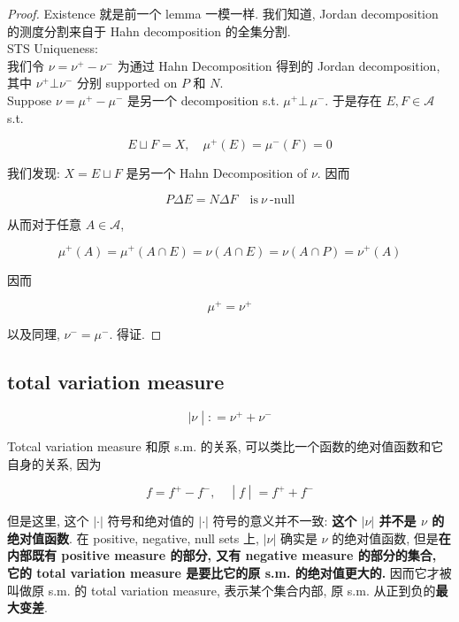 \begin{proof}

Existence 就是前一个 lemma 一模一样. 我们知道, Jordan decomposition 的测度分割来自于 Hahn decomposition 的全集分割.\\
STS Uniqueness:\\
我们令 \(\nu = \nu^{+} - \nu^{-}\) 为通过 Hahn Decomposition 得到的 Jordan decomposition, 其中 \(\nu^{+}\bot\nu^{-}\) 分别 supported on \(P\) 和 \(N\).\\
Suppose \(\nu = \mu^{+} - \mu^{-}\) 是另一个 decomposition s.t. \(\mu^{+}\bot\,\mu^{-}\). 于是存在 \(E,F \in \mathcal{A}\) s.t.

\[E \sqcup F = X,\quad\mu^{+}(E) = \mu^{-}(F) = 0\]

我们发现: \(X = E \sqcup F\) 是另一个 Hahn Decomposition of \(\nu\). 因而

\[P\Delta E = N\Delta F\quad\text{is}\ \nu\ \text{-null}\]

从而对于任意 \(A \in \mathcal{A}\),

\[\mu^{+}(A) = \mu^{+}(A \cap E) = \nu(A \cap E) = \nu(A \cap P) = \nu^{+}(A)\]

因而

\[\mu^{+} = \nu^{+}\]

以及同理, \(\nu^{-} = \mu^{-}\). 得证.

\end{proof}

\subsection{total variation measure}\label{total-variation-measure}

\begin{definition}{}

\[\left. |\nu \middle| : = \nu^{+} + \nu^{-} \right.\]

\end{definition}

Totcal variation measure 和原 s.m. 的关系, 可以类比一个函数的绝对值函数和它自身的关系, 因为

\[\left. f = f^{+} - f^{-},\quad \middle| f \middle| = f^{+} + f^{-} \right.\]

但是这里, 这个 \(| \cdot |\) 符号和绝对值的 \(| \cdot |\) 符号的意义并不一致: \textbf{这个 \(|\nu|\) 并不是 \(\nu\) 的绝对值函数}. 在 positive, negative, null sets 上, \(|\nu|\) 确实是 \(\nu\) 的绝对值函数, 但是\textbf{在内部既有 positive measure 的部分, 又有 negative measure 的部分的集合, 它的 total variation measure 是要比它的原 s.m. 的绝对值更大的.} 因而它才被叫做原 s.m. 的 total variation measure, 表示某个集合内部, 原 s.m. 从正到负的\textbf{最大变差}.

